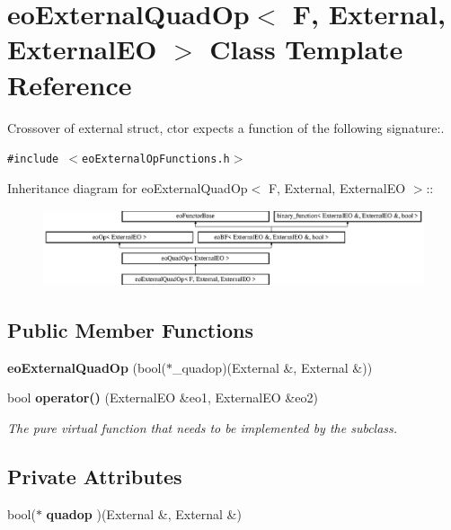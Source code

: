 \section{eo\-External\-Quad\-Op$<$ F, External, External\-EO $>$ Class Template Reference}
\label{classeo_external_quad_op}
Crossover of external struct, ctor expects a function of the following signature:.  


{\tt \#include $<$eo\-External\-Op\-Functions.h$>$}

Inheritance diagram for eo\-External\-Quad\-Op$<$ F, External, External\-EO $>$::\begin{figure}[H]
\begin{center}
\leavevmode
\includegraphics[height=2.26263cm]{classeo_external_quad_op}
\end{center}
\end{figure}
\subsection*{Public Member Functions}
\begin{CompactItemize}
\item 
{\bf eo\-External\-Quad\-Op} (bool($\ast$\_\-quadop)(External \&, External \&))\label{classeo_external_quad_op_a0}

\item 
bool {\bf operator()} (External\-EO \&eo1, External\-EO \&eo2)\label{classeo_external_quad_op_a1}

\begin{CompactList}\small\item\em The pure virtual function that needs to be implemented by the subclass. \item\end{CompactList}\end{CompactItemize}
\subsection*{Private Attributes}
\begin{CompactItemize}
\item 
bool($\ast$ {\bf quadop} )(External \&, External \&)\label{classeo_external_quad_op_r0}

\end{CompactItemize}


